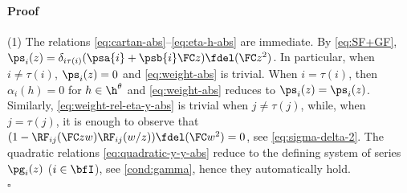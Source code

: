 \documentclass[reqno]{amsart}
\numberwithin{equation}{section}
\newenvironment{pf}{\medskip\paragraph{{\sc Proof}}}{\hfill$\square$\par\medskip}
\begin{document}
\begin{pf}
(1) The relations \eqref{eq:cartan-abs}--\eqref{eq:eta-h-abs} are immediate.
By \eqref{eq:SF+GF}, $\ps_i(z)=\delta_{i\tau(i)}(\psa{i}+\psb{i}\FC z)\fdel(\FC z^2)$. 
In particular, when $i\neq\tau(i)$, $\ps_i(z)=0$ and \eqref{eq:weight-abs} is trivial.
When $i=\tau(i)$, then $\alpha_i(h)=0$ for $h\in\h^{\theta}$ and \eqref{eq:weight-abs}
reduces to $\ps_i(z)=\ps_i(z)$.
Similarly, \eqref{eq:weight-rel-eta-y-abs} is trivial when $j\neq\tau(j)$, while, 
when $j=\tau(j)$, it is enough to observe that $(1-\RF_{ij}(\FC zw)\RF_{ij}(w/z))\fdel(\FC w^2)=0$, see \eqref{eq:sigma-delta-2}. 
The quadratic relations \eqref{eq:quadratic-y-y-abs} reduce to the defining system 
of series $\pg_i(z)$ ($i\in\bfI$), see \eqref{cond:gamma}, hence they automatically hold.\\


\end{pf}
\end{document}
